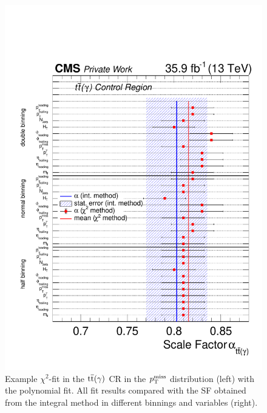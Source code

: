 \begin{figure}[tbp]
 \includegraphics[width=\pairwidth]{figures/plots_CR/chi/TT_Compare}
 \caption{Example $\chi^2$-fit in the ${\mathrm{t}\overline{\mathrm{t}}}(\gamma)$ CR in the $p_{\mathrm{T}}^\text{miss}$ distribution (left) with the polynomial fit. All fit results compared with the SF obtained from the integral method in different binnings and variables (right).}
 \label{fig:chiTT}
\end{figure}

